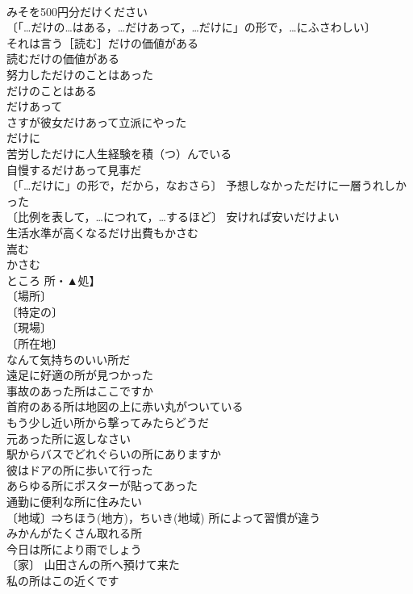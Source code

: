 \documentclass[8pt]{extreport}
\begin{document}
\begin{CJK}{UTF8}{min}
\\	みそを500円分だけください 
\\	〔「…だけの…はある，…だけあって，…だけに」の形で，…にふさわしい〕　
\\	それは言う［読む］だけの価値がある 
\\	読むだけの価値がある　
\\	努力しただけのことはあった 
\\	だけのことはある　
\\	だけあって　
\\	さすが彼女だけあって立派にやった 
\\	だけに　
\\	苦労しただけに人生経験を積（つ）んでいる 
\\	自慢するだけあって見事だ 
\\	〔「…だけに」の形で，だから，なおさら〕 予想しなかっただけに一層うれしかった 
\\	〔比例を表して，…につれて，…するほど〕 安ければ安いだけよい 
\\	生活水準が高くなるだけ出費もかさむ 
\\	嵩む 
\\	かさむ 
\\	ところ	所・▲処】	
\\	〔場所〕
\\	〔特定の〕
\\	〔現場〕
\\	〔所在地〕
\\	なんて気持ちのいい所だ 
\\	遠足に好適の所が見つかった 
\\	事故のあった所はここですか 
\\	首府のある所は地図の上に赤い丸がついている 
\\	もう少し近い所から撃ってみたらどうだ 
\\	元あった所に返しなさい 
\\	駅からバスでどれぐらいの所にありますか 
\\	彼はドアの所に歩いて行った 
\\	あらゆる所にポスターが貼ってあった 
\\	通勤に便利な所に住みたい 
\\	〔地域〕⇒ちほう(地方)，ちいき(地域) 所によって習慣が違う 
\\	みかんがたくさん取れる所 
\\	今日は所により雨でしょう 
\\	〔家〕 山田さんの所へ預けて来た 
\\	私の所はこの近くです 

\end{CJK}
\end{document}
